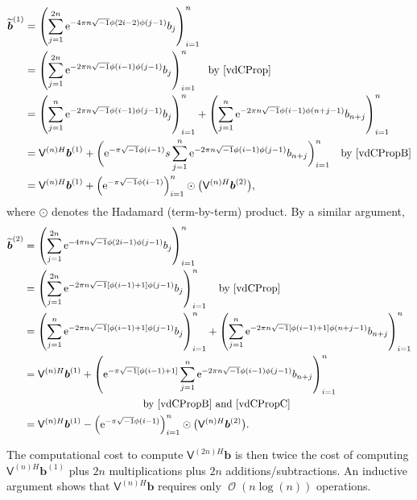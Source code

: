 \documentclass{iitthesis}          %
\DeclareMathOperator{\Order}{{\mathcal O}}
\newcommand{\bm}[1]{\boldsymbol{#1}}
\newcommand{\vb}{\bm{b}}
\newcommand{\mV}{\mathsf{V}}
\newcommand{\me}{\mathrm{e}}
\begin{document}
\begin{align*}
\widetilde{\vb}^{(1)} &= \left( \sum_{j=1}^{2n}  \me^{-4 \pi n \sqrt{-1} \phi(2i-2)\phi(j-1)} b_{j} \right)_{i=1}^n \\
&= \left( \sum_{j=1}^{2n}  \me^{-2 \pi n \sqrt{-1} \phi(i-1)\phi(j-1)} b_{j} \right)_{i=1}^n \quad \text{by \eqref{vdCProp}}\\
&= \left( \sum_{j=1}^{n}  \me^{-2 \pi n \sqrt{-1} \phi(i-1)\phi(j-1)} b_{j} \right)_{i=1}^n  +  \left( \sum_{j=1}^{n}  \me^{-2 \pi n \sqrt{-1} \phi(i-1)\phi(n+j-1)} b_{n+j} \right)_{i=1}^n \\
&= \mV^{(n)H}\vb^{(1)}  +  \biggl(  \me^{-\pi \sqrt{-1} \phi(i-1)}  s \sum_{j=1}^{n}  \me^{-2 \pi n \sqrt{-1} \phi(i-1)\phi(j-1)} b_{n+j} \biggr)_{i=1}^n \quad  \text{by \eqref{vdCPropB}}\\
&= \mV^{(n)H}\vb^{(1)} +  \left(  \me^{-\pi \sqrt{-1} \phi(i-1)} \right)_{i=1}^n \odot \bigl(\mV^{(n)H}\vb^{(2)} \bigr),
\end{align*}
where $\odot$ denotes the Hadamard (term-by-term) product.  By a similar argument, 
\begin{align*}
\widetilde{\vb}^{(2)} &= \left( \sum_{j=1}^{2n}  \me^{-4 \pi n \sqrt{-1} \phi(2i-1)\phi(j-1)} b_{j} \right)_{i=1}^n \\
&= \left( \sum_{j=1}^{2n}  \me^{-2 \pi n \sqrt{-1} [\phi(i-1)+1]\phi(j-1)} b_{j} \right)_{i=1}^n \quad \text{by \eqref{vdCProp}}\\
&= \left( \sum_{j=1}^{n}  \me^{-2 \pi n \sqrt{-1} [\phi(i-1)+1]\phi(j-1)} b_{j} \right)_{i=1}^n 
 +  \left( \sum_{j=1}^{n}  \me^{-2 \pi n \sqrt{-1} [\phi(i-1)+1]\phi(n+j-1)} b_{n+j} \right)_{i=1}^n \\
&= \mV^{(n)H}\vb^{(1)} 
+  \left(  \me^{ -\pi \sqrt{-1} [\phi(i-1) + 1]}  \sum_{j=1}^{n}  \me^{-2 \pi n \sqrt{-1} \phi(i-1)\phi(j-1)} b_{n+j} \right)_{i=1}^n \\
& \hspace{4cm}  \text{by \eqref{vdCPropB} and \eqref{vdCPropC}}\\
&= \mV^{(n)H}\vb^{(1)} -  \left(  \me^{-\pi \sqrt{-1} \phi(i-1)} \right)_{i=1}^n \odot \bigl(\mV^{(n)H}\vb^{(2)} \bigr).
\end{align*}

The computational cost to compute $\mV^{(2n)H}\vb$ is then twice the cost of computing $\mV^{(n)H}\vb^{(1)}$ plus $2n$ multiplications plus $2n$ additions/subtractions.  An inductive argument shows that $\mV^{(n)H}\vb$ requires only $\Order(n \log(n))$ operations.

\label{sec:non_integer_kernel_order}
\end{document}

